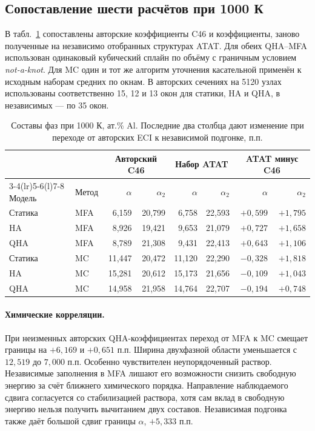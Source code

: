 \subsection{Сопоставление шести расчётов при 1000 К}
В табл.~\ref{tab:ce-six} сопоставлены авторские коэффициенты C46 и
коэффициенты, заново полученные на независимо отобранных структурах ATAT.
Для обеих QHA--MFA использован одинаковый кубический сплайн по объёму
с граничным условием \textit{not-a-knot}. Для MC один и тот же алгоритм
уточнения касательной применён к исходным наборам средних по окнам.
В авторских сечениях на 5120 узлах использованы соответственно 15, 12 и
13 окон для статики, HA и QHA, в независимых --- по 35 окон.

\begin{table}[htbp]
\centering\small
\caption{Составы фаз при 1000 К, ат.\% Al. Последние два столбца дают
изменение при переходе от авторских ECI к независимой подгонке, п.п.}
\label{tab:ce-six}
\begin{tabular}{@{}llrr rr rr@{}}
\toprule
 & & \multicolumn{2}{c}{Авторский C46} &
 \multicolumn{2}{c}{Набор ATAT} & \multicolumn{2}{c}{ATAT минус C46}\\
\cmidrule(lr){3-4}\cmidrule(lr){5-6}\cmidrule(l){7-8}
Модель & Метод & \(\alpha\) & \(\alpha_2\) & \(\alpha\) & \(\alpha_2\)
 & \(\alpha\) & \(\alpha_2\)\\
\midrule
Статика & MFA & 6,159 & 20,799 & 6,758 & 22,593 & \(+0{,}599\) & \(+1{,}795\)\\
HA      & MFA & 8,926 & 19,421 & 9,653 & 21,079 & \(+0{,}727\) & \(+1{,}658\)\\
QHA     & MFA & 8,789 & 21,308 & 9,431 & 22,413 & \(+0{,}643\) & \(+1{,}106\)\\
\addlinespace
Статика & MC  & 11,447 & 20,472 & 11,120 & 22,290 & \(-0{,}328\) & \(+1{,}818\)\\
HA      & MC  & 15,281 & 20,612 & 15,173 & 21,656 & \(-0{,}109\) & \(+1{,}043\)\\
QHA     & MC  & 14,958 & 21,958 & 14,764 & 22,707 & \(-0{,}194\) & \(+0{,}748\)\\
\bottomrule
\end{tabular}
\end{table}

\paragraph{Химические корреляции.}
При неизменных авторских QHA-коэффициентах переход от MFA к MC смещает
границы на \(+6{,}169\) и \(+0{,}651\) п.п. Ширина двухфазной области
уменьшается с \(12{,}519\) до \(7{,}000\) п.п. Особенно чувствителен
неупорядоченный раствор. Независимые заполнения в MFA лишают его
возможности снизить свободную энергию за счёт ближнего химического
порядка. Направление наблюдаемого сдвига согласуется со стабилизацией
раствора, хотя сам вклад в свободную энергию нельзя получить вычитанием
двух составов. Независимая подгонка также даёт большой сдвиг границы
\(\alpha\), \(+5{,}333\) п.п.

